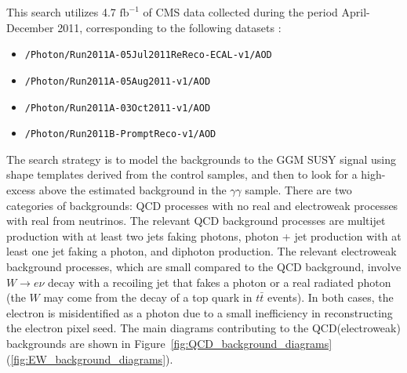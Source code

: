\documentclass[dissertation.tex]{subfiles}
\begin{document}
This search utilizes 4.7 $\mbox{fb}^{-1}$ of CMS data collected during the period April-December 2011, corresponding to the following datasets \cite{DAS}:

\begin{itemize}
\item \verb+/Photon/Run2011A-05Jul2011ReReco-ECAL-v1/AOD+
\item \verb+/Photon/Run2011A-05Aug2011-v1/AOD+
\item \verb+/Photon/Run2011A-03Oct2011-v1/AOD+
\item \verb+/Photon/Run2011B-PromptReco-v1/AOD+
\end{itemize}

The search strategy is to model the backgrounds to the GGM SUSY signal using \MET shape templates derived from the control samples, and then to look for a high-\MET excess above the estimated background in the $\gamma\gamma$ sample.  There are two categories of backgrounds: QCD processes with no real \MET and electroweak processes with real \MET from neutrinos.  The relevant QCD background processes are multijet production with at least two jets faking photons, photon + jet production with at least one jet faking a photon, and diphoton production.  The relevant electroweak background processes, which are small compared to the QCD background, involve $W\rightarrow e\nu$ decay with a recoiling jet that fakes a photon or a real radiated photon (the $W$ may come from the decay of a top quark in $t\bar{t}$ events).  In both cases, the electron is misidentified as a photon due to a small inefficiency in reconstructing the electron pixel seed.  The main diagrams contributing to the QCD(electroweak) backgrounds are shown in Figure~\ref{fig:QCD_background_diagrams}(\ref{fig:EW_background_diagrams}).
\end{document}
